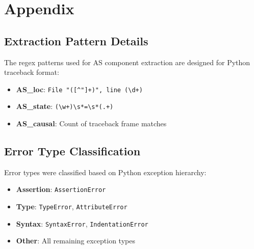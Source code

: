 \section{Appendix}

\subsection{Extraction Pattern Details}

The regex patterns used for AS component extraction are designed for Python traceback format:

\begin{itemize}
    \item \textbf{AS\_loc}: \texttt{File "([{\textasciicircum}"]+)", line (\textbackslash d+)}
    \item \textbf{AS\_state}: \texttt{(\textbackslash w+)\textbackslash s*=\textbackslash s*(.+)}
    \item \textbf{AS\_causal}: Count of traceback frame matches
\end{itemize}

\subsection{Error Type Classification}

Error types were classified based on Python exception hierarchy:
\begin{itemize}
    \item \textbf{Assertion}: \texttt{AssertionError}
    \item \textbf{Type}: \texttt{TypeError}, \texttt{AttributeError}
    \item \textbf{Syntax}: \texttt{SyntaxError}, \texttt{IndentationError}
    \item \textbf{Other}: All remaining exception types
\end{itemize}
